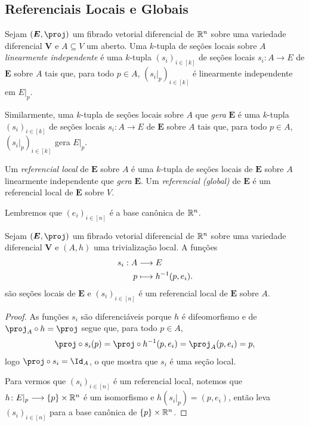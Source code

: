 \subsection{Referenciais Locais e Globais}

\begin{defi}
Sejam $(\bm E,\proj)$ um fibrado vetorial diferencial de $\mathbb{R}^n$ sobre uma variedade diferencial $\bm V$ e $A \subseteq V$ um aberto. Uma $k$-tupla de seções locais sobre $A$ \emph{linearmente independente} é uma $k$-tupla $(s_i)_{i \in [k]}$ de seções locais $s_i\colon A \to E$ de $\bm E$ sobre $A$ tais que, para todo $p \in A$, $(s_i|_p)_{i \in [k]}$ é linearmente independente em $E|_p$.

Similarmente, uma $k$-tupla de seções locais sobre $A$ que \emph{gera} $\bm E$ é uma $k$-tupla $(s_i)_{i \in [k]}$ de seções locais $s_i\colon A \to E$ de $\bm E$ sobre $A$ tais que, para todo $p \in A$, $(s_i|_p)_{i \in [k]}$ gera $E|_p$.

Um \emph{referencial local} de $\bm E$ sobre $A$ é uma $k$-tupla de seções locais de $\bm E$ sobre $A$ linearmente independente que \emph{gera} $\bm E$. Um \emph{referencial (global)} de $\bm E$ é um referencial local de $\bm E$ sobre $V$.
\end{defi}

Lembremos que $(e_i)_{i \in [n]}$ é a base canônica de $\mathbb{R}^n$.

\begin{prop}
Sejam $(\bm E,\proj)$ um fibrado vetorial diferencial de $\mathbb{R}^n$ sobre uma variedade diferencial $\bm V$ e $(A,h)$ uma trivialização local. A funções
	\begin{align*}
	{s_i}: {A} &\longrightarrow {E} \\{p} &\longmapsto {h^{-1}(p,e_i)}.
	\end{align*}
são seções locais de $\bm E$ e $(s_i)_{i \in [n]}$ é um referencial local de $\bm E$ sobre $A$.
\end{prop}
\begin{proof}
As funções $s_i$ são diferenciáveis porque $h$ é difeomorfismo e de $\proj_A \circ h = \proj$ segue que, para todo $p \in A$,
	\begin{equation*}
	\proj \circ s_i(p) = \proj \circ h\inv (p,e_i) = \proj_A (p,e_i) = p,
	\end{equation*}
logo $\proj \circ s_i = \Id_A$, o que mostra que $s_i$ é uma seção local.

Para vermos que $(s_i)_{i \in [n]}$ é um referencial local, notemos que $h\colon E|_p \longrightarrow \{p\} \times \mathbb{R}^n$ é um isomorfismo e $h(s_i|_p) = (p,e_i)$, então leva $(s_i)_{i \in [n]}$ para a base canônica de $\{p\} \times \mathbb{R}^n$.
\end{proof}

